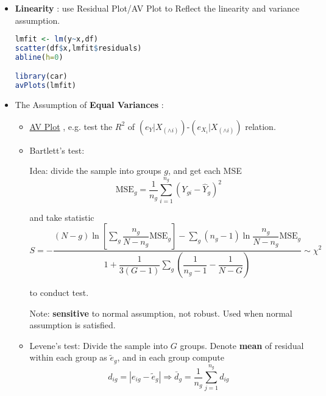 \begin{itemize}[topsep=2pt,itemsep=2pt]
    \item \textbf{Linearity} : use Residual Plot/AV Plot to Reflect the linearity and variance assumption.
    
\begin{rcode}
\begin{lstlisting}[language=R]
lmfit <- lm(y~x,df)
scatter(df$x,lmfit$residuals)
abline(h=0)

library(car)
avPlots(lmfit)
\end{lstlisting}

\end{rcode}
    \item The Assumption of \textbf{Equal Variances} :
    \begin{itemize}[topsep=2pt,itemsep=2pt]
        \item \hyperlink{AVPlot}{AV Plot} , e.g. test the $ R^2 $ of $ (e_Y|X_{(\wedge i)} )$-$( e_{X_i}|X_{(\wedge i)}) $ relation.
        \item Bartlett's test:
        
        Idea: divide the sample into groups $ g $, and get each MSE
        \begin{equation}
             \mathrm{MSE}_g=\dfrac{1}{n_g}\sum_{i=1}^{n_g}(Y_{gi}-\hat{Y}_g)^2
        \end{equation}
        
        and take statistic
        \begin{equation}
            S=-\dfrac{(N-g)\ln\left[ \sum\limits_g \dfrac{n_g}{N-n_g}\mathrm{MSE}_g \right]-\sum\limits_{g}(n_g-1)\ln \dfrac{n_g}{N-n_g}\mathrm{MSE}_g }{1+\dfrac{1}{3(G-1)}\sum\limits_g\left( \dfrac{1}{n_g-1}-\dfrac{1}{N-G} \right)} \sim \chi^2
        \end{equation}

        to conduct test. 

        Note: \textbf{sensitive}  to normal assumption, not robust. Used when normal assumption is satisfied.
        \item Levene's test: Divide the sample into $ G $ groups. Denote \textbf{mean}  of residual within each group as $ \tilde{e}_g $, and in each group compute
        \begin{equation}
            d_{ig}=|e_{ig}-\tilde{e}_g| \Rightarrow \bar{d}_{g}=\dfrac{1}{n_g}\sum_{j=1}^{n_g}d_{ig}
        \end{equation}


\end{itemize}
\end{itemize}
